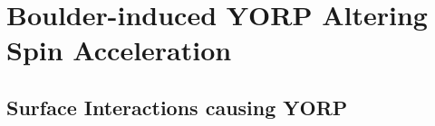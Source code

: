 \chapter{Boulder-induced YORP Altering Spin Acceleration}
\label{yorp_spin}

\section{Surface Interactions causing YORP}\label{formulation}

